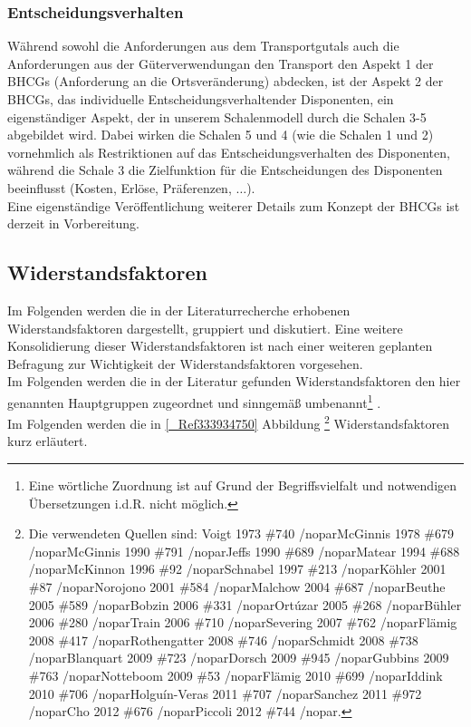 % 
\subsubsection{Entscheidungsverhalten}
\label{_Toc366766111}
\label{_Toc366775305}
Während sowohl die \glqq Anforderungen aus dem Transportgut\grqq  als auch die \glqq Anforderungen aus der Güterverwendung\grqq  an den Transport den Aspekt 1 der BHCGs (\glqq Anforderung an die Ortsveränderung\grqq ) abdecken, ist der Aspekt 2 der BHCGs, das \glqq individuelle Entscheidungsverhalten\grqq  der Disponenten, ein eigenständiger Aspekt, der in unserem Schalenmodell durch die Schalen 3-5 abgebildet wird. Dabei wirken die Schalen 5 und 4 (wie die Schalen 1 und 2) vornehmlich als Restriktionen auf das Entscheidungsverhalten des Disponenten, während die Schale 3 die Zielfunktion für die Entscheidungen des Disponenten beeinflusst (Kosten, Erlöse, Präferenzen, $\ldots$).~\\
Eine eigenständige Veröffentlichung weiterer Details zum Konzept der BHCGs ist derzeit in Vorbereitung.~\\


% 
\subsection{Widerstandsfaktoren}
\label{_Ref333942877}
\label{_Toc335661023}
\label{_Toc366766112}
\label{_Toc366775306}
\label{_Toc365801608}
\label{_Toc363572045}
\label{_Toc363601745}
Im Folgenden werden die in der Literaturrecherche erhobenen Widerstandsfaktoren dargestellt, gruppiert und diskutiert. Eine weitere Konsolidierung dieser Widerstandsfaktoren ist nach einer weiteren geplanten Befragung zur Wichtigkeit der Widerstandsfaktoren vorgesehen.~\\
Im Folgenden werden die in der Literatur gefunden Widerstandsfaktoren den hier genannten Hauptgruppen zugeordnet und sinngemäß umbenannt\footnote{%
 Eine wörtliche Zuordnung ist auf Grund der Begriffsvielfalt und notwendigen Übersetzungen i.d.R. nicht möglich.
}%
.~\\
Im Folgenden werden die in \autoref{_Ref333934750} Abbildung \footnote{%
 Die verwendeten Quellen sind: {Voigt 1973 \#740 /nopar}{McGinnis 1978 \#679 /nopar}{McGinnis 1990 \#791 /nopar}{Jeffs 1990 \#689 /nopar}{Matear 1994 \#688 /nopar}{McKinnon 1996 \#92 /nopar}{Schnabel 1997 \#213 /nopar}{Köhler 2001 \#87 /nopar}{Norojono 2001 \#584 /nopar}{Malchow 2004 \#687 /nopar}{Beuthe 2005 \#589 /nopar}{Bobzin 2006 \#331 /nopar}{Ortúzar 2005 \#268 /nopar}{Bühler 2006 \#280 /nopar}{Train 2006 \#710 /nopar}{Severing 2007 \#762 /nopar}{Flämig 2008 \#417 /nopar}{Rothengatter 2008 \#746 /nopar}{Schmidt 2008 \#738 /nopar}{Blanquart 2009 \#723 /nopar}{Dorsch 2009 \#945 /nopar}{Gubbins 2009 \#763 /nopar}{Notteboom 2009 \#53 /nopar}{Flämig 2010 \#699 /nopar}{Iddink 2010 \#706 /nopar}{Holguín-Veras 2011 \#707 /nopar}{Sanchez 2011 \#972 /nopar}{Cho 2012 \#676 /nopar}{Piccoli 2012 \#744 /nopar}.
}%
 Widerstandsfaktoren kurz erläutert.~\\



